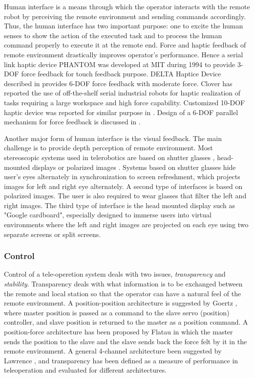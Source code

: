 Human interface is a means through which the operator interacts with the remote robot by perceiving the remote environment and sending commands accordingly. Thus, the human interface has two important purpose: one to excite the human senses to show the action of the executed task and to process the human command properly to execute it at the remote end.  Force and haptic feedback of remote environment drastically improves operator's performance. Hence a serial link haptic device PHANTOM \cite{massie1994phantom} was developed at MIT during 1994 to provide 3-DOF force feedback  for touch feedback purpose. DELTA Haptice Device described in \cite{grange2001overview} provides 6-DOF force feedback with moderate force. Clover \cite{clover1997dynamic} has reported  the use of off-the-shelf serial industrial robots for haptic realization of tasks requiring a large workspace and high force capability. Customized 10-DOF  haptic device was reported  for similar purpose in \cite{ueberle2004vishard10}. Design  of a 6-DOF parallel mechanism for force feedback is discussed in \cite{yoon2001design}.

Another major form of human interface is the visual feedback. The main challenge is to provide depth perception of remote environment. Most stereoscopic systems used in telerobotics are based on shutter glasses \cite{aracil1997telerobotic,matthies1992stereo}, head-mounted displays \cite{matthies1992stereo} or polarized images \cite{hirzinger1994robots}. Systems based on shutter glasses hide user's eyes alternately in synchronization to screen refreshment, which projects images for left and right eye alternately. A second type of interfaces is based on polarized images. The user is also required to wear glasses that filter the left and right images. The third type of interface is  the head mounted display such as "Google cardboard",  especially designed to immerse users into virtual environments where the left and right images are projected on each eye using two separate screens or split screens.

\subsubsection{Control}
Control of a tele-operetion system deals with two issues, \textit{transparency} and \textit{stability}. Transparency deals with what information is to be exchanged between the remote and local station so that the operator can have a natural feel of the remote environment. A position-position architecture is suggested by  Goertz \cite{goertz1961anl}, where  master position is passed as a command to the slave servo (position) controller, and slave position is returned to the master as a position command. A position-force architecture has been proposed by Flatau \cite{flatau1977sm} in which the master sends the position to the slave and the slave sends back the force felt by it in the remote environment. A general 4-channel architecture been suggested by Lawrence \cite{lawrence1993stability}, and transparency has been defined  as a measure of performance in teleoperation and evaluated for different architectures.

